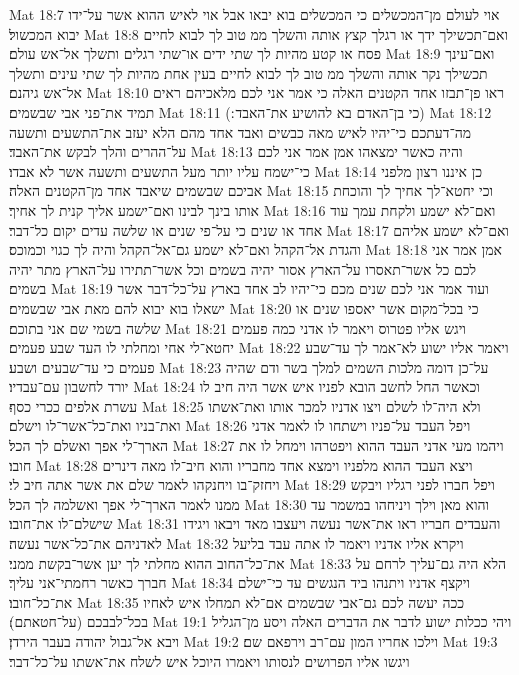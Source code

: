 Mat 18:7  אוי לעולם מן־המכשלים כי המכשלים בוא יבאו אבל אוי לאיש ההוא אשר על־ידו יבוא המכשול׃
Mat 18:8  ואם־תכשילך ידך או רגלך קצץ אותה והשלך ממ טוב לך לבוא לחיים פסח או קטע מהיות לך שתי ידים או־שתי רגלים ותשלך אל־אש עולם׃
Mat 18:9  ואם־עינך תכשילך נקר אותה והשלך ממ טוב לך לבוא לחיים בעין אחת מהיות לך שתי עינים ותשלך אל־אש גיהנם׃
Mat 18:10  ראו פן־תבזו אחד הקטנים האלה כי אמר אני לכם מלאכיהם ראים תמיד את־פני אבי שבשמים׃
Mat 18:11  (כי בן־האדם בא להושיע את־האבד ׃)
Mat 18:12  מה־דעתכם כי־יהיו לאיש מאה כבשים ואבד אחד מהם הלא יעזב את־התשעים ותשעה על־ההרים והלך לבקש את־האבד׃
Mat 18:13  והיה כאשר ימצאהו אמן אמר אני לכם כי־ישמח עליו יותר מעל התשעים ותשעה אשר לא אבדו׃
Mat 18:14  כן איננו רצון מלפני אביכם שבשמים שיאבד אחד מן־הקטנים האלה׃
Mat 18:15  וכי יחטא־לך אחיך לך והוכחת אותו בינך לבינו ואם־ישמע אליך קנית לך אחיך׃
Mat 18:16  ואם־לא ישמע ולקחת עמך עוד אחד או שנים כי על־פי שנים או שלשה עדים יקום כל־דבר׃
Mat 18:17  ואם־לא ישמע אליהם והגדת אל־הקהל ואם־לא ישמע גם־אל־הקהל והיה לך כגוי וכמוכס׃
Mat 18:18  אמן אמר אני לכם כל אשר־תאסרו על־הארץ אסור יהיה בשמים וכל אשר־תתירו על־הארץ מתר יהיה בשמים׃
Mat 18:19  ועוד אמר אני לכם שנים מכם כי־יהיו לב אחד בארץ על־כל־דבר אשר ישאלו בוא יבוא להם מאת אבי שבשמים׃
Mat 18:20  כי בכל־מקום אשר יאספו שנים או שלשה בשמי שם אני בתוכם׃
Mat 18:21  ויגש אליו פטרוס ויאמר לו אדני כמה פעמים יחטא־לי אחי ומחלתי לו העד שבע פעמים׃
Mat 18:22  ויאמר אליו ישוע לא־אמר לך עד־שבע פעמים כי עד־שבעים ושבע׃
Mat 18:23  על־כן דומה מלכות השמים למלך בשר ודם שהיה יורד לחשבון עם־עבדיו׃
Mat 18:24  וכאשר החל לחשב הובא לפניו איש אשר היה חיב לו עשרת אלפים ככרי כסף׃
Mat 18:25  ולא היה־לו לשלם ויצו אדניו למכר אותו ואת־אשתו ואת־בניו ואת־כל־אשר־לו וישלם׃
Mat 18:26  ויפל העבד על־פניו וישתחו לו לאמר אדני הארך־לי אפך ואשלם לך הכל׃
Mat 18:27  ויהמו מעי אדני העבד ההוא ויפטרהו וימחל לו את חובו׃
Mat 18:28  ויצא העבד ההוא מלפניו וימצא אחד מחבריו והוא חיב־לו מאה דינרים ויחזק־בו ויחנקהו לאמר שלם את אשר אתה חיב לי׃
Mat 18:29  ויפל חברו לפני רגליו ויבקש ממנו לאמר הארך־לי אפך ואשלמה לך הכל׃
Mat 18:30  והוא מאן וילך ויניחהו במשמר עד שישלם־לו את־חובו׃
Mat 18:31  והעבדים חבריו ראו את־אשר נעשה ויעצבו מאד ויבאו ויגידו לאדניהם את־כל־אשר נעשה׃
Mat 18:32  ויקרא אליו אדניו ויאמר לו אתה עבד בליעל את־כל־החוב ההוא מחלתי לך יען אשר־בקשת ממני׃
Mat 18:33  הלא היה גם־עליך לרחם על חברך כאשר רחמתי־אני עליך׃
Mat 18:34  ויקצף אדניו ויתנהו ביד הנגשים עד כי־ישלם את־כל־חובו׃
Mat 18:35  ככה יעשה לכם גם־אבי שבשמים אם־לא תמחלו איש לאחיו בכל־לבבכם (על־חטאתם)׃
Mat 19:1  ויהי ככלות ישוע לדבר את הדברים האלה ויסע מן־הגליל ויבא אל־גבול יהודה בעבר הירדן׃
Mat 19:2  וילכו אחריו המון עם־רב וירפאם שם׃
Mat 19:3  ויגשו אליו הפרושים לנסותו ויאמרו היוכל איש לשלח את־אשתו על־כל־דבר׃
